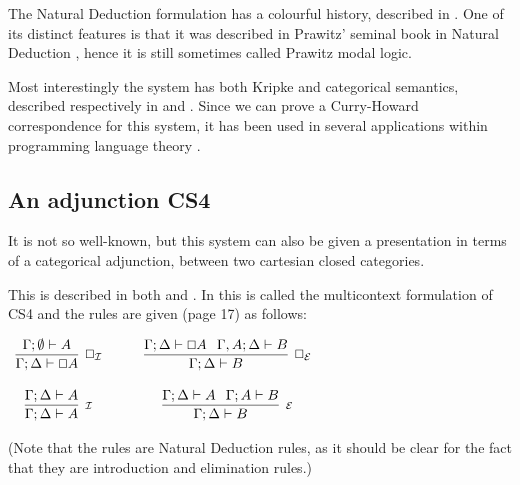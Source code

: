 \documentclass{article}
\let\Diamond\relax
\renewcommand{\Box}{\oblong}
\begin{document}
The Natural Deduction formulation has a colourful history, described
in \cite{CS4}. One of its distinct features is that it was described
in Prawitz' seminal book in Natural Deduction \cite{prawitz1965},
hence it is still sometimes called Prawitz modal logic.

Most interestingly the system has both Kripke and categorical
semantics, described respectively in \cite{alechinaetal} and
\cite{CS4}. Since we can prove a Curry-Howard correspondence for this
system, it has been used in several applications within programming
language theory .

\subsection{An adjunction CS4}
It is not so well-known, but this system can also be given a
presentation in terms of a categorical adjunction, between two
cartesian closed categories.

This is described in both \cite{CS4} and \cite{icalp1998}. In
\cite{CS4} this is called the multicontext formulation of CS4 and the
rules are given (page 17) as follows:

\begin{center}
  \begin{math}
    \begin{array}{ccccc}              
      \infer[\Box_{\mathcal{I}}]{\Gamma; \Delta \vdash \Box A}{
        \Gamma;\emptyset \vdash  A
      }
      & \quad &
      \infer[\Box_{\mathcal{E}}]{\Gamma;\Delta \vdash B}{\Gamma; \Delta \vdash \Box A \hspace{.1in}
        \Gamma, A;\Delta \vdash B
      }\\\\
      \infer[\Diamond_{\mathcal{I}}]{\Gamma;\Delta \vdash \Diamond A}{
        \Gamma;\Delta \vdash A
      }
      & \quad &
      \infer[\Diamond_{\mathcal{E}}]{\Gamma;\Delta \vdash \Diamond B}{
        \Gamma ;\Delta \vdash \Diamond A \hspace{.1in}\Gamma; A\vdash \Diamond B
      }
    \end{array}        
  \end{math}
\end{center}
(Note that the rules are Natural Deduction rules, as it should be clear for the fact that they are introduction and elimination rules.)
\end{document}
